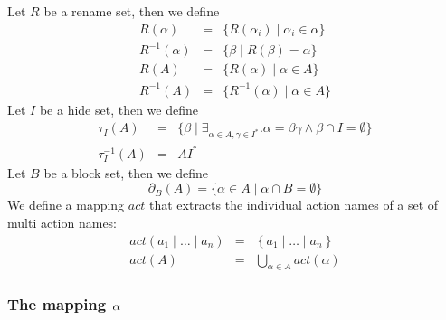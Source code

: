 \documentclass{article}
\begin{document}
Let $R$ be a rename set, then we define%
\[
\begin{array}{lll}
R(\alpha ) & = & \{R(\alpha _{i})\mid \alpha _{i}\in \alpha \} \\ 
R^{-1}(\alpha ) & = & \{\beta \mid R(\beta )=\alpha \} \\ 
R(A) & = & \{R(\alpha )\mid \alpha \in A\} \\ 
R^{-1}(A) & = & \{R^{-1}(\alpha )\mid \alpha \in A\}%
\end{array}%
\]%
Let $I$ be a hide set, then we define%
\[
\begin{array}{ccc}
\tau _{I}(A) & = & \{\beta \mid \exists _{\alpha \in A,\gamma \in I^{\ast
}}.\alpha =\beta \gamma \wedge \beta \cap I=\emptyset \} \\ 
\tau _{I}^{-1}(A) & = & AI^{\ast }%
\end{array}%
\]%
Let $B$ be a block set, then we define%
\[
\partial _{B}(A)=\{\alpha \in A\mid \alpha \cap B=\emptyset \} 
\]%
We define a mapping $act$ that extracts the individual action names of a set
of multi action names:%
\[
\begin{array}{lll}
act\left( a_{1}\mid \ldots \mid a_{n}\right) & = & \left\{ a_{1}\mid \ldots
\mid a_{n}\right\} \\ 
act\left( A\right) & = & \bigcup_{\alpha \in A}act\left( \alpha \right)%
\end{array}%
\]

\subsubsection{The mapping $\protect\alpha $}
\end{document}
